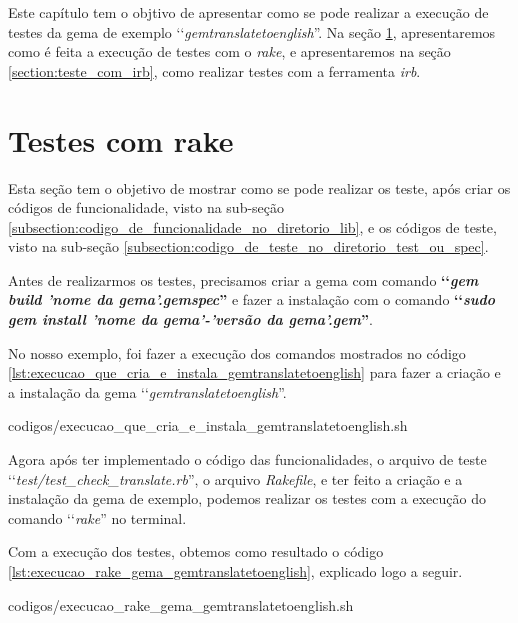 Este capítulo tem o objtivo de apresentar como se pode realizar a execução de testes da gema de
exemplo ‘‘\emph{gemtranslatetoenglish}''. Na seção \ref{section:teste_com_rake}, apresentaremos
como é feita a execução de testes com o \emph{rake}, e apresentaremos na seção
\ref{section:teste_com_irb}, como realizar testes com a ferramenta \emph{irb}.


\section{Testes com rake}
\label{section:teste_com_rake}


Esta seção tem o objetivo de mostrar como se pode realizar os teste, após criar os códigos de
funcionalidade, visto na sub-seção \ref{subsection:codigo_de_funcionalidade_no_diretorio_lib}, e os códigos
de teste, visto na sub-seção \ref{subsection:codigo_de_teste_no_diretorio_test_ou_spec}.

Antes de realizarmos os testes, precisamos criar a gema com comando \textbf{‘‘\emph{gem build 'nome da gema'.gemspec}''}
e fazer a instalação com o comando \textbf{‘‘\emph{sudo gem install 'nome da gema'-'versão da gema'.gem}''}. 

No nosso exemplo, foi fazer a execução dos comandos mostrados no código
\ref{lst:execucao_que_cria_e_instala_gemtranslatetoenglish} para fazer a criação e a instalação da gema
‘‘\emph{gemtranslatetoenglish}''.


{codigos/execucao_que_cria_e_instala_gemtranslatetoenglish.sh }

Agora após ter implementado o código das funcionalidades, o arquivo de teste
‘‘\emph{test/test\_check\_translate.rb}'', o arquivo \emph{Rakefile}, e ter feito a criação e a instalação
da gema de exemplo, podemos realizar os testes com a execução do comando ‘‘\emph{rake}'' no terminal.

Com a execução dos testes, obtemos como resultado o código \ref{lst:execucao_rake_gema_gemtranslatetoenglish},
explicado logo a seguir.


{codigos/execucao_rake_gema_gemtranslatetoenglish.sh }

